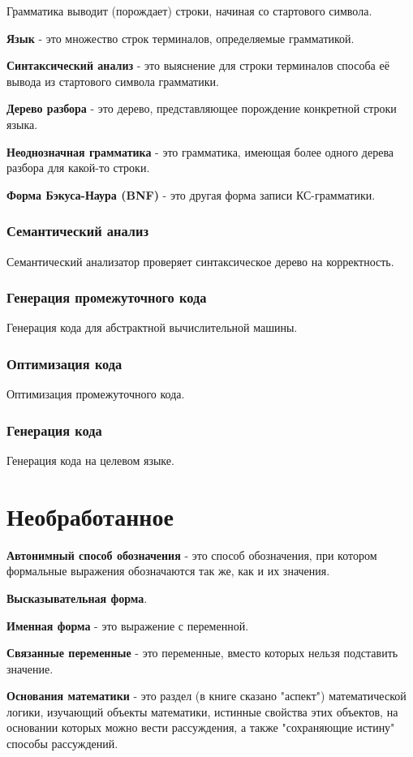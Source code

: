 \documentclass[oneside]{book}
\begin{document}
    Грамматика выводит (порождает) строки, начиная со стартового символа.

    \textbf{Язык} - это множество строк терминалов, определяемые грамматикой.

    \textbf{Синтаксический анализ} - это выяснение для строки терминалов
    способа её вывода из стартового символа грамматики.

    \textbf{Дерево разбора} - это дерево, представляющее
    порождение конкретной строки языка.

    \textbf{Неоднозначная грамматика} - это грамматика,
    имеющая более одного дерева разбора для какой-то строки.

    \textbf{Форма Бэкуса-Наура (BNF)} - это другая форма записи КС-грамматики.

    \subsection{Семантический анализ}
    Семантический анализатор проверяет синтаксическое дерево на корректность.

    \subsection{Генерация промежуточного кода}
    Генерация кода для абстрактной вычислительной машины.

    \subsection{Оптимизация кода}
    Оптимизация промежуточного кода.

    \subsection{Генерация кода}
    Генерация кода на целевом языке.

    \chapter{Необработанное}
    \textbf{Автонимный способ обозначения} - это
    способ обозначения,
    при котором формальные выражения обозначаются так же,
    как и их значения.

    \textbf{Высказывательная форма}.

    \textbf{Именная форма} - это
    выражение с переменной.

    \textbf{Связанные переменные} - это
    переменные, вместо которых
    нельзя подставить значение.

    \textbf{Основания математики} - это
    раздел (в книге сказано "аспект")
    математической логики,
    изучающий объекты математики,
    истинные свойства этих объектов,
    на основании которых можно вести рассуждения,
    а также "сохраняющие истину"{ }способы рассуждений.
\end{document}
